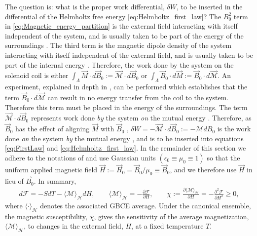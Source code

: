 \documentclass[english,12pt]{ttuthes}
\newcommand{\Hc}{\mathcal{H}}
\newcommand{\Fc}{\mathcal{F}}
\begin{document}
The question is: what is the proper work differential, $\delta W$, to be
inserted in the differential of the Helmholtz free energy
\eqref{eq:Helmholtz_first_law}? The $B_0^2$ term in
\eqref{eq:Magnetic_energy_partition} is the external field 
interacting with itself independent of the system, and is usually taken
to be part of the energy of the surroundings
\cite{Robertson-1993}. The third term is the magnetic dipole density
of the system interacting with itself independent of the external
field, and is usually taken to be part of the internal energy
\cite{Robertson-1993}. Therefore, the work done by the system on the
solenoid coil is either $\int_\Lambda\vec{M}\cdot
d\vec{B}_0:=\vec{\mathcal{M}}\cdot d\vec{B}_0$ or
$\int_\Lambda\vec{B}_0\cdot d\vec{M}:=\vec{B}_0\cdot d\vec{\mathcal{M}}$. An experiment,
explained in depth in \cite{Robertson-1993}, can be performed which
establishes that the term $\vec{B}_0\cdot d\vec{\mathcal{M}}$ can result
in no energy transfer from the coil to the system. Therefore this term
must be placed in the energy of the surroundings. The term
$\vec{\mathcal{M}}\cdot d\vec{B}_0$ represents work done \emph{by} the
system \emph{on} the mutual energy \cite{Robertson-1993}. Therefore,
as $\vec{B}_0$ has the effect of aligning $\vec{M}$ with $\vec{B}_0$
\cite{Thompson-1988,Jackson-1999,Griffiths-1999},
$\delta W=-\vec{\mathcal{M}}\cdot d\vec{B}_0:=-\mathcal{M}dB_0$ is the work done
\emph{on} the system \emph{by} the mutual energy
\cite{Robertson-1993}, and is to be inserted into equations
\eqref{eq:FirstLaw} and \eqref{eq:Helmholtz_first_law}. In the
remainder of this section we adhere to the notations of
\cite{Sethna-2006,Thompson-1988,Christensen-2005,Baker-1990,Firas}
and use Gaussian units \cite{Jackson-1999} $(\epsilon_0\equiv\mu_0\equiv1)$ so that the
uniform applied magnetic field
$\vec{H}:=\vec{H}_0=\vec{B}_0/\mu_0\equiv\vec{B}_0$, and we therefore use  
$\vec{H}$ in lieu of $\vec{B}_0$. In summary,
% 
\begin{align}\label{eq:Magnetic_First_Law}
  d\Fc=-SdT-\langle\mathcal{M}\rangle_{\Hc}dH, \qquad
  \langle\mathcal{M}\rangle_{\Hc}=-\frac{\partial\Fc}{\partial H},\qquad
  \chi:=\frac{\partial\langle\mathcal{M}\rangle_{\Hc}}{\partial H}=-\frac{\partial^2\Fc}{\partial H^2}\geq0,
\end{align} 
%
where $\langle\cdot\rangle_{\Hc}$ denotes the associated GBCE average. Under the
canonical ensemble, the magnetic susceptibility, $\chi$, gives the
sensitivity of the average magnetization,
$\langle\mathcal{M}\rangle_{\Hc}$, to changes in the external field, $H$,
at a fixed temperature $T$. 
%
\end{document}

